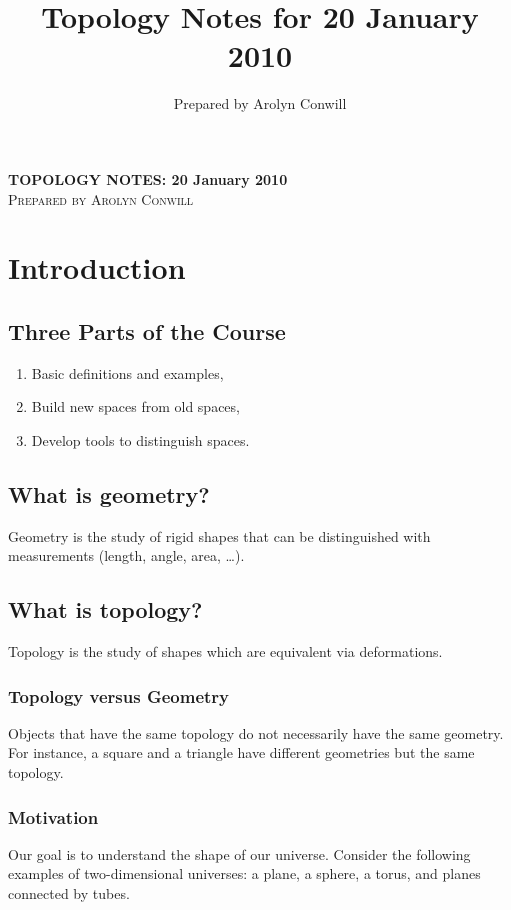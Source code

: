 \documentclass[12pt]{amsart}
\title{Topology Notes for 20 January 2010}
\author{Prepared by Arolyn Conwill}
\begin{document}
\begin{center}
\textbf{TOPOLOGY NOTES: 20 January 2010} \\
\textsc{Prepared by Arolyn Conwill}
\end{center}

\section{Introduction}
\subsection{Three Parts of the Course}
\begin{enumerate}
	\item Basic definitions and examples,
	\item Build new spaces from old spaces,
	\item Develop tools to distinguish spaces.
\end{enumerate}

\subsection{What is geometry?} Geometry is the study of rigid shapes that can be distinguished with measurements (length, angle, area, \ldots).

\subsection{What is topology?} Topology is the study of shapes which are equivalent via deformations. 

\subsubsection{Topology versus Geometry} Objects that have the same topology do not necessarily have the same geometry. For instance, a square and a triangle have different geometries but the same topology.
\vspace{2cm}

\subsubsection{Motivation} Our goal is to understand the shape of our universe. Consider the following examples of two-dimensional universes: a plane, a sphere, a torus, and planes connected by tubes.
\vspace{2cm}
\end{document}
